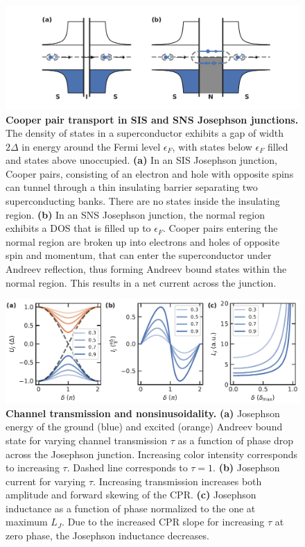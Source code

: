 \begin{figure}
	\centering
	\includegraphics[width=\linewidth]{chapter-introduction/figs/model_SNS_DOS}
	\caption{
		\textbf{Cooper pair transport in SIS and SNS Josephson junctions.}
		The density of states in a superconductor exhibits a gap of width $2\Delta$ in energy around the Fermi level $\epsilon_F$, with states below $\epsilon_F$ filled and states above unoccupied.
		\textbf{(a)} In an SIS Josephson junction, Cooper pairs, consisting of an electron and hole with opposite spins can tunnel through a thin insulating barrier separating two superconducting banks.
		There are no states inside the insulating region.
		\textbf{(b)} In an SNS Josephson junction, the normal region exhibits a DOS that is filled up to $\epsilon_F$.
		Cooper pairs entering the normal region are broken up into electrons and holes of opposite spin and momentum, that can enter the superconductor under Andreev reflection, thus forming Andreev bound states within the normal region.
		This results in a net current across the junction.
	}
	\label{fig:modelsnsdos}
\end{figure}

\begin{figure}
	\centering
	\includegraphics[width=\linewidth]{chapter-introduction/figs/model_SNS_EjIc}
	\caption{
		\textbf{Channel transmission and nonsinusoidality.}
		\textbf{(a)} Josephson energy of the ground (blue) and excited (orange) Andreev bound state for varying channel transmission $\tau$ as a function of phase drop across the Josephson junction.
		Increasing color intensity corresponds to increasing $\tau$.
		Dashed line corresponds to $\tau=1$.
		\textbf{(b)} Josephson current for varying $\tau$.
		Increasing transmission increases both amplitude and forward skewing of the CPR.
		\textbf{(c)} Josephson inductance as a function of phase normalized to the one at maximum $L_J$.
		Due to the increased CPR slope for increasing $\tau$ at zero phase, the Josephson inductance decreases.
	}
	\label{fig:modelsnsejic}
\end{figure}


